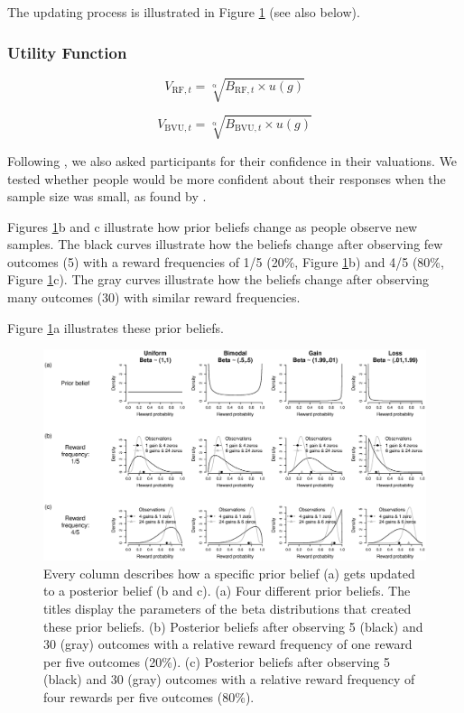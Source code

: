 \documentclass[a4paper, man, natbib, floatsintext]{apa6} %
\begin{document}
The updating process is illustrated in Figure \ref{fig:sensi} (see also below).

\subsubsection{Utility Function}

$$V_{\mathrm{RF}, t} = \sqrt[\mathrm{\alpha}]{{B}_{\mathrm{RF}, t} \times u({g})}$$

$$V_{\mathrm{BVU}, t} = \sqrt[\mathrm{\alpha}]{{B}_{\mathrm{BVU}, t} \times u({g})}$$


Following \cite{Griffin1992}, we also asked participants for their confidence in their valuations. We tested whether people would be more confident about their responses when the sample size was small, as found by \cite{Griffin1992}. 

Figures \ref{fig:sensi}b  and c illustrate how prior beliefs change as people observe new samples. The black curves illustrate how the beliefs change after observing few outcomes (5) with a reward frequencies of 1/5 (20\%, Figure \ref{fig:sensi}b)  and 4/5 (80\%, Figure \ref{fig:sensi}c). The gray curves illustrate how the beliefs change after observing many outcomes (30) with similar reward frequencies.


Figure \ref{fig:sensi}a illustrates these prior beliefs.
\begin{figure}[htbp] 
  \centering
\includegraphics[width=1\linewidth, keepaspectratio]{sensi1.eps}
  \caption{Every column describes how a specific prior belief (a) gets updated to a posterior belief (b and c). (a) Four different prior beliefs. The titles display the parameters of the beta distributions that created these prior beliefs. (b) Posterior beliefs after observing 5 (black) and 30 (gray) outcomes with a relative reward frequency of one reward per five outcomes (20\%). (c) Posterior beliefs after observing 5 (black) and 30 (gray) outcomes with a relative reward frequency of four rewards per five outcomes (80\%).}
  \label{fig:sensi}
\end{figure}
\end{document}
